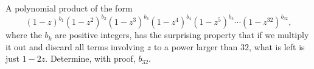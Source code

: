 A polynomial product of the form \[(1-z)^{b_1}(1-z^2)^{b_2}(1-z^3)^{b_3}(1-z^4)^{b_4}(1-z^5)^{b_5}\cdots(1-z^{32})^{b_{32}},\]where the $b_k$ are positive integers, has the surprising property that if we multiply it out and discard all terms involving $z$ to a power larger than $32$,  what is left is just $1-2z$.  Determine, with proof, $b_{32}$.